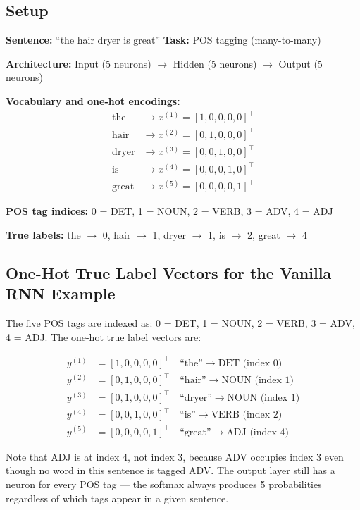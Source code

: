 \subsection{Setup}

\textbf{Sentence:} ``the hair dryer is great'' \quad \textbf{Task:} POS tagging
(many-to-many)

\textbf{Architecture:} Input (5 neurons) $\to$ Hidden (5 neurons) $\to$ Output (5 neurons)

\textbf{Vocabulary and one-hot encodings:}
\begin{align*}
    \text{the}   &\to x^{(1)} = [1,0,0,0,0]^\top \\
    \text{hair}  &\to x^{(2)} = [0,1,0,0,0]^\top \\
    \text{dryer} &\to x^{(3)} = [0,0,1,0,0]^\top \\
    \text{is}    &\to x^{(4)} = [0,0,0,1,0]^\top \\
    \text{great} &\to x^{(5)} = [0,0,0,0,1]^\top
\end{align*}

\textbf{POS tag indices:} 0 = DET, 1 = NOUN, 2 = VERB, 3 = ADV, 4 = ADJ

\textbf{True labels:} the $\to$ 0, hair $\to$ 1, dryer $\to$ 1, is $\to$ 2, great $\to$ 4

\subsection{One-Hot True Label Vectors for the Vanilla RNN Example}

The five POS tags are indexed as: 0 = DET, 1 = NOUN, 2 = VERB, 3 = ADV, 4 = ADJ.
The one-hot true label vectors are:

\begin{align*}
    y^{(1)} &= [1, 0, 0, 0, 0]^\top \quad \text{``the''} \to \text{DET (index 0)} \\
    y^{(2)} &= [0, 1, 0, 0, 0]^\top \quad \text{``hair''} \to \text{NOUN (index 1)} \\
    y^{(3)} &= [0, 1, 0, 0, 0]^\top \quad \text{``dryer''} \to \text{NOUN (index 1)} \\
    y^{(4)} &= [0, 0, 1, 0, 0]^\top \quad \text{``is''} \to \text{VERB (index 2)} \\
    y^{(5)} &= [0, 0, 0, 0, 1]^\top \quad \text{``great''} \to \text{ADJ (index 4)}
\end{align*}

Note that ADJ is at index 4, not index 3, because ADV occupies index 3 even though
no word in this sentence is tagged ADV. The output layer still has a neuron for every
POS tag --- the softmax always produces 5 probabilities regardless of which tags
appear in a given sentence.


